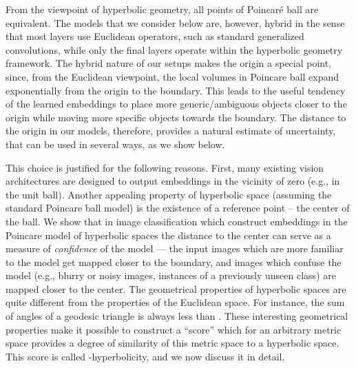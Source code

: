 \documentclass[10pt,twocolumn,letterpaper]{article}
\begin{document}
From the viewpoint of hyperbolic geometry, all points of Poincar\'e ball are equivalent. The models that we consider below are, however, hybrid in the sense that most layers use Euclidean operators, such as standard generalized convolutions, while only the final layers operate within the hyperbolic geometry framework. The hybrid nature of our setups makes the origin a special point, since, from the Euclidean viewpoint, the local volumes in Poincare ball expand exponentially from the origin to the boundary. This leads to the useful tendency of the learned embeddings to place more generic/ambiguous objects closer to the origin while moving more specific objects towards the boundary. The distance to the origin in our models, therefore, provides a natural estimate of uncertainty, that can be used in several ways, as we show below.

This choice is justified for the following reasons. First, many existing vision architectures are designed to output embeddings in the vicinity of zero (e.g., in the unit ball).  
Another appealing property of hyperbolic space (assuming the standard Poincare ball model) is the existence of a reference point -- the center of the ball. We show that in image classification which construct embeddings in the Poincare model of hyperbolic spaces the distance to the center can serve as a measure of \emph{confidence} of the model --- the input images which are more familiar to the model get mapped closer to the boundary, and images which confuse the model (e.g., blurry or noisy images, instances of a previously unseen class) are mapped closer to the center.
The geometrical properties of hyperbolic spaces are quite different from the properties of the Euclidean space. For instance, the sum of angles of a geodesic triangle is always less than . These interesting geometrical properties make it possible to construct a ``score'' which for an arbitrary metric space provides a degree of similarity of this metric space to a hyperbolic space. This score is called -hyperbolicity, and we now discuss it in detail.
\end{document}
